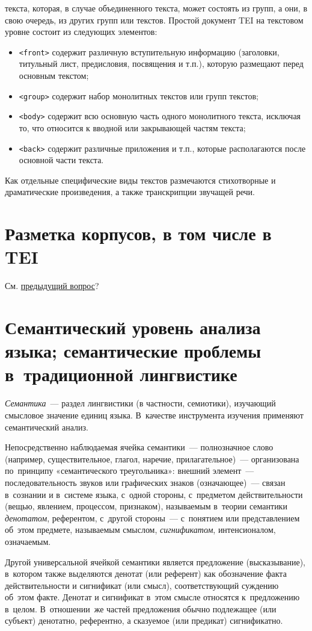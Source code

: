 \documentclass[12pt]{article}
\theoremstyle{definition}
\theoremstyle{remark}
\numberwithin{equation}{section}
\begin{document}
текста, которая, в случае объединенного текста, может состоять из групп, а они, в свою очередь, из других групп или текстов. Простой документ TEI на текстовом уровне состоит из следующих
элементов:
\begin{itemize}
\item \texttt{<front>} содержит различную вступительную информацию (заголовки, титульный лист,
предисловия, посвящения и т.п.), которую размещают перед основным текстом;
\item \texttt{<group>} содержит набор монолитных текстов или групп текстов;
\item \texttt{<body>} содержит всю основную часть одного монолитного текста, исключая то, что
относится к вводной или закрывающей частям текста;
\item \texttt{<back>} содержит различные приложения и т.п., которые располагаются после основной
части текста.
\end{itemize}
Как отдельные специфические виды текстов размечаются стихотворные и драматические произведения, а также транскрипции звучащей речи.

\section{Разметка корпусов, в том числе в TEI}

См. \hyperref[sec:TEI]{предыдущий вопрос}?

\section{Семантический уровень анализа языка; семантические проблемы 
в~традиционной лингвистике}
\textsl{Семантика}~--- раздел лингвистики (в частности, семиотики), 
изучающий смысловое значение единиц языка. В~качестве инструмента 
изучения применяют семантический анализ.

Непосредственно наблюдаемая ячейка семантики~--- полнозначное слово 
(например, существительное, глагол, наречие, прилагательное)~--- 
организована по~принципу «семантического треугольника»: внешний 
элемент~--- последовательность звуков или графических знаков 
(означающее)~--- связан в~сознании и в~системе языка, с~одной стороны, 
с~предметом действительности (вещью, явлением, процессом, признаком), 
называемым в~теории семантики {\sl денотатом}, референтом, с~другой стороны~--- 
с~понятием или представлением об~этом предмете, называемым смыслом, 
{\sl сигнификатом}, интенсионалом, означаемым.

Другой универсальной ячейкой семантики является предложение (высказывание), 
в~котором также выделяются денотат (или референт) как обозначение факта 
действительности и сигнификат (или смысл), соответствующий суждению об~этом 
факте. Денотат и сигнификат в~этом смысле относятся к~предложению в~целом. 
В~отношении~же частей предложения обычно подлежащее (или субъект) денотатно, 
референтно, а сказуемое (или предикат) сигнификатно.
\end{document}
